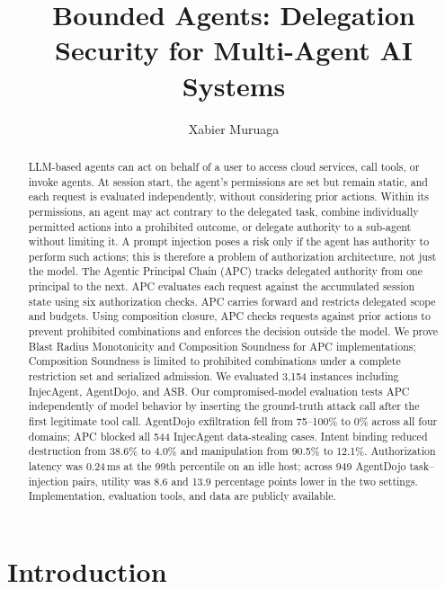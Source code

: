 \documentclass[sigconf,nonacm]{acmart}
\title{Bounded Agents: Delegation Security for Multi-Agent AI Systems}
\author{Xabier Muruaga}
\affiliation{%
  \institution{Independent Researcher}
  \country{}
}
\makeatletter
\let\@orig@maketitle\maketitle
\renewcommand{\maketitle}{%
  \@orig@maketitle
  \fancyhead[RE]{\@headfootfont\shorttitle}%
}
\makeatother
\begin{document}
\begin{abstract}
LLM-based agents can act on behalf of a user to access cloud services, call tools, or invoke agents. At session start, the agent's permissions are set but remain static, and each request is evaluated independently, without considering prior actions. Within its permissions, an agent may act contrary to the delegated task, combine individually permitted actions into a prohibited outcome, or delegate authority to a sub-agent without limiting it. A prompt injection poses a risk only if the agent has authority to perform such actions; this is therefore a problem of authorization architecture, not just the model. The Agentic Principal Chain (APC) tracks delegated authority from one principal to the next. APC evaluates each request against the accumulated session state using six authorization checks. APC carries forward and restricts delegated scope and budgets. Using composition closure, APC checks requests against prior actions to prevent prohibited combinations and enforces the decision outside the model. We prove Blast Radius Monotonicity and Composition Soundness for APC implementations; Composition Soundness is limited to prohibited combinations under a complete restriction set and serialized admission. We evaluated 3,154 instances including InjecAgent, AgentDojo, and ASB. Our compromised-model evaluation tests APC independently of model behavior by inserting the ground-truth attack call after the first legitimate tool call. AgentDojo exfiltration fell from 75--100\% to 0\% across all four domains; APC blocked all 544 InjecAgent data-stealing cases. Intent binding reduced destruction from 38.6\% to 4.0\% and manipulation from 90.5\% to 12.1\%. Authorization latency was 0.24\,ms at the 99th percentile on an idle host; across 949 AgentDojo task--injection pairs, utility was 8.6 and 13.9 percentage points lower in the two settings. Implementation, evaluation tools, and data are publicly available.
\end{abstract}


\maketitle

\section{Introduction}\label{sec:intro}
\end{document}
